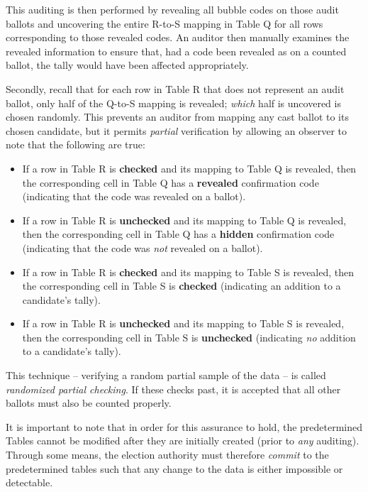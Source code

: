 \documentclass[10pt,twocolumn]{article}
\newcommand{\term}[1]{\textit{#1}}
\begin{document}
This auditing is then performed by revealing all bubble codes on those audit ballots and uncovering the
entire R-to-S mapping in Table Q for all rows corresponding to those revealed codes. An auditor then
manually examines the revealed information to ensure that, had a code been revealed as on a counted
ballot, the tally would have been affected appropriately.

Secondly, recall that for each row in Table R that does not represent an audit ballot, only half of
the Q-to-S mapping is revealed; \emph{which} half is uncovered is chosen randomly. This prevents an
auditor from mapping any cast ballot to its chosen candidate, but it permits \emph{partial}
verification by allowing an observer to note that the following are true:
\begin{itemize}
	\item
		If a row in Table R is \textbf{checked} and its mapping to Table Q is revealed, then the
		corresponding cell in Table Q has a \textbf{revealed} confirmation code (indicating that the
		code was revealed on a ballot).
	\item
		If a row in Table R is \textbf{unchecked} and its mapping to Table Q is revealed, then the
		corresponding cell in Table Q has a \textbf{hidden} confirmation code (indicating that the code
		was \emph{not} revealed on a ballot).
	\item
		If a row in Table R is \textbf{checked} and its mapping to Table S is revealed, then the
		corresponding cell in Table S is \textbf{checked} (indicating an addition to a candidate's
		tally).
	\item
		If a row in Table R is \textbf{unchecked} and its mapping to Table S is revealed, then the
		corresponding cell in Table S is \textbf{unchecked} (indicating \emph{no} addition to a
		candidate's tally).
\end{itemize}
This technique -- verifying a random partial sample of the data -- is called \term{randomized partial
checking}. If these checks past, it is accepted that all other ballots must also be counted properly.

It is important to note that in order for this assurance to hold, the predetermined Tables cannot be
modified after they are initially created (prior to \emph{any} auditing). Through some means, the
election authority must therefore \term{commit} to the predetermined tables such that any change to
the data is either impossible or detectable.
\end{document}
